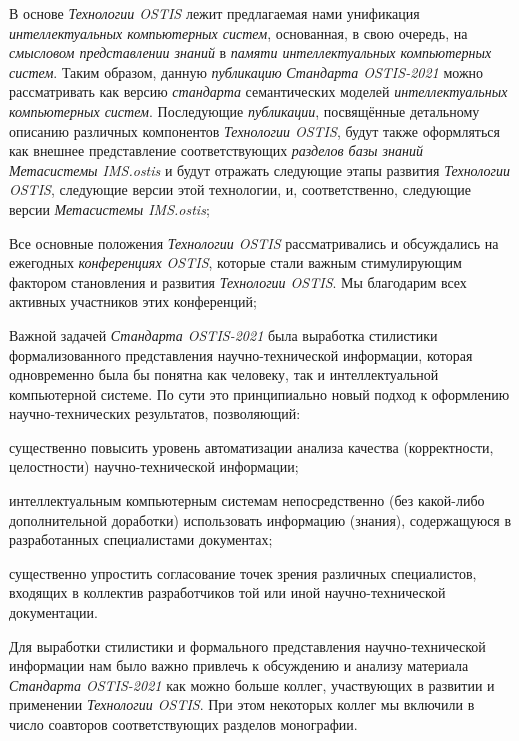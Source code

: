 \begin{SCn}
{\begin{scnitemize}
		\item В основе \textit{Технологии OSTIS} лежит предлагаемая нами унификация \textit{интеллектуальных компьютерных систем}, основанная, в свою очередь, на \textit{смысловом представлении знаний} в \textit{памяти интеллектуальных компьютерных систем}. Таким образом, данную \textit{публикацию} \textit{Стандарта OSTIS-2021} можно рассматривать как версию \textit{стандарта} семантических моделей \textit{интеллектуальных компьютерных систем}. Последующие \textit{публикации}, посвящённые детальному описанию различных компонентов \textit{Технологии OSTIS}, будут также оформляться как внешнее представление соответствующих \textit{разделов базы знаний} \textit{Метасистемы IMS.ostis} и будут отражать следующие этапы развития \textit{Технологии OSTIS}, следующие версии этой технологии, и, соответственно, следующие версии \textit{Метасистемы IMS.ostis};
		\item Все основные положения \textit{Технологии OSTIS} рассматривались и обсуждались на ежегодных \textit{конференциях OSTIS}, которые стали важным стимулирующим фактором становления и развития \textit{Технологии OSTIS}. Мы благодарим всех активных участников этих конференций;
		\item Важной задачей \textit{Стандарта OSTIS-2021} была выработка стилистики формализованного представления научно-технической информации, которая одновременно была бы понятна как человеку, так и интеллектуальной компьютерной системе. По сути это принципиально новый подход к оформлению научно-технических результатов, позволяющий:
		\begin{scnitemizeii}
			\item существенно повысить уровень автоматизации анализа качества (корректности, целостности) научно-технической информации;
			\item интеллектуальным компьютерным системам непосредственно (без какой-либо дополнительной {} доработки) использовать информацию (знания), содержащуюся в разработанных специалистами документах;
			\item существенно упростить согласование точек зрения различных специалистов, входящих в коллектив разработчиков той или иной научно-технической документации.
		\end{scnitemizeii}
		\item Для выработки стилистики и формального представления научно-технической информации нам было важно привлечь к обсуждению и анализу материала \textit{Стандарта OSTIS-2021} как можно больше коллег, участвующих в развитии и применении \textit{Технологии OSTIS}. При этом некоторых коллег мы включили в число соавторов соответствующих разделов монографии.

\end{scnitemize}}
\end{SCn}
